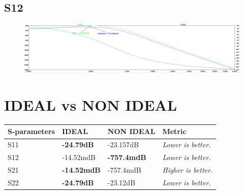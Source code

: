 \documentclass{article}
\begin{document}
\subsection*{S12}\begin{figure}[H]
	\centering
	\includegraphics[scale=0.27]{./figs/s12.png}
\end{figure}

\section*{\hfil IDEAL vs NON IDEAL}
\begin{table}[H]
\centering
\begin{tabular}{||l|l|l|l||}
\hline
\textbf{S-parameters} & \textbf{IDEAL}     & \textbf{NON IDEAL} & \textbf{Metric}            \\
\hline
S11          & \textbf{-24.79dB}  & -23.157dB & \textit{Lower is better.}  \\
\hline
S12          & -14.52mdB & \textbf{-757.4mdB} & \textit{Lower is better.}  \\
\hline
S21          & \textbf{-14.52mdB} & -757.4mdB & \textit{Higher is better.} \\
\hline
S22          & \textbf{-24.79dB}  & -23.12dB  & \textit{Lower is better.} \\
\hline
\end{tabular}
\end{table}
\end{document}
